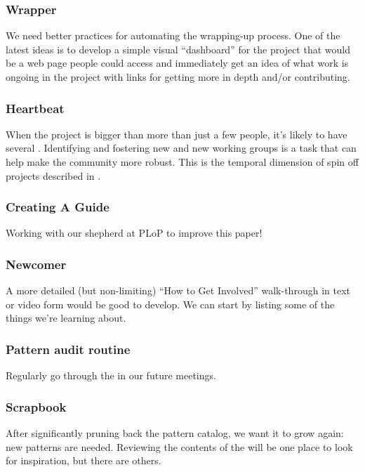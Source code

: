 \subsubsection*{Wrapper}  We need better practices for automating the wrapping-up process. One of the latest ideas is to develop a simple visual ``dashboard'' for the project that would be a web page people could access and immediately get an idea of what work is ongoing in the project with links for getting more in depth and/or contributing.

\subsubsection*{Heartbeat} When the project is bigger than more than just a few people, it's likely to have several .  Identifying and fostering new  and new working groups is a task that can help make the community more robust.  This is the temporal dimension of spin off projects described in .

\subsubsection*{Creating A Guide}
Working with our shepherd at PLoP to improve this paper!

\subsubsection*{Newcomer} A more detailed (but non-limiting) ``How to Get Involved'' walk-through in text or video form would be good to develop. We can start by listing some of the things we're learning about.

\subsubsection*{Pattern audit routine} Regularly go through the  in our future meetings.

\subsubsection*{Scrapbook} After significantly pruning back the pattern catalog, we want it to grow again: new patterns are needed.  Reviewing the contents of the  will be one place to look for inspiration, but there are others.




